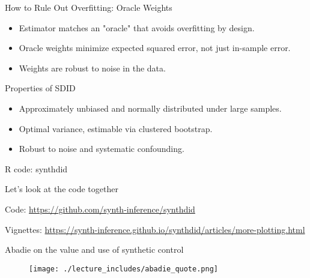 \documentclass{beamer}
\begin{document}
\begin{frame}{How to Rule Out Overfitting: Oracle Weights}
\begin{itemize}
\item Estimator matches an "oracle" that avoids overfitting by design.
\item Oracle weights minimize expected squared error, not just in-sample error.
\item Weights are robust to noise in the data.
\end{itemize}
\end{frame}


\begin{frame}{Properties of SDID}
\begin{itemize}
\item Approximately unbiased and normally distributed under large samples.
\item Optimal variance, estimable via clustered bootstrap.
\item Robust to noise and systematic confounding.
\end{itemize}
\end{frame}






\begin{frame}{R code: synthdid}

Let's look at the code together

\bigskip

Code: \url{https://github.com/synth-inference/synthdid} 

\bigskip

Vignettes: \url{https://synth-inference.github.io/synthdid/articles/more-plotting.html}

\end{frame}




\begin{frame}{Abadie on the value and use of synthetic control}

	\begin{figure}
	\texttt{[image: ./lecture\_includes/abadie\_quote.png]}
	\end{figure}

\end{frame}
\end{document}
